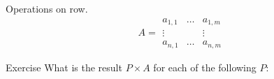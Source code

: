 \documentclass{beamer}
\begin{document}
  \begin{frame}{Operations on row.}
    \[A = \begin{array}{|ccc|} a_{1,1} & \dots & a_{1,m}\\ \vdots & & \vdots\\ a_{n,1} & \dots & a_{n, m} \end{array}\]
    \begin{block}{Exercise}
      What is the result $P \times A$ for each of the following $P$:
      \begin{itemize}
      \end{itemize}
    \end{block}
    
  \end{frame}
  
\end{document}
